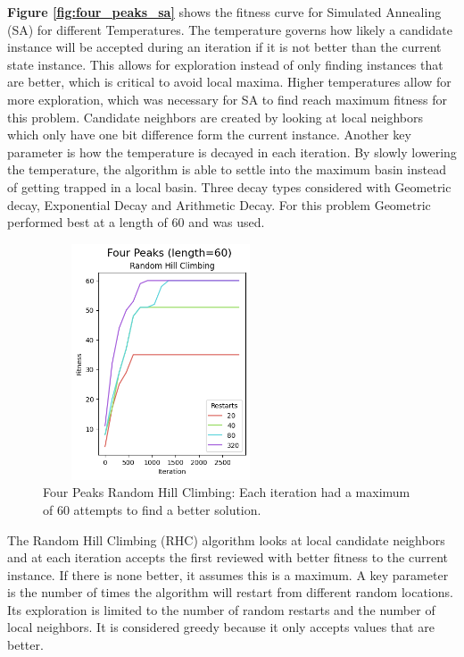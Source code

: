 \documentclass[letterpaper]{article} %
\begin{document}
\textbf{Figure \ref{fig:four_peaks_sa}} shows the fitness curve for Simulated Annealing (SA) for different Temperatures.  The temperature governs how likely a candidate instance will be accepted during an iteration if it is not better than the current state instance.  This allows for exploration instead of only finding instances that are better, which is critical to avoid local maxima.    Higher temperatures allow for more exploration, which was necessary for SA to find reach maximum fitness for this problem.  Candidate neighbors are created by looking at local neighbors which only have one bit difference form the current instance.  Another key parameter is how the temperature is decayed in each iteration.  By slowly lowering the temperature, the algorithm is able to settle into the maximum basin instead of getting trapped in a local basin.  Three decay types considered with Geometric decay, Exponential Decay and Arithmetic Decay.  For this problem Geometric performed best at a length of 60 and was used.


\begin{figure}[htb]
\centering
\includegraphics[width=2.75in, height=2.75in]{figures/Four_Peaks_length=60_Random_Hill_Climbing_l_60_ma_120_r_20__40__80__320_.png}
\caption{Four Peaks Random Hill Climbing: Each iteration had a maximum of 60 attempts to find a better solution. }
\label{fig:four_peaks_rhc}
\end{figure}


The Random Hill Climbing (RHC) algorithm looks at local candidate neighbors and at each iteration accepts the first reviewed with better fitness to the current instance.  If there is none better, it assumes this is a maximum.   A key parameter is the number of times the algorithm will restart from different random locations.   Its exploration is limited to the number of random restarts and the number of local neighbors.  It is considered greedy because it only accepts values that are better.
\end{document}
